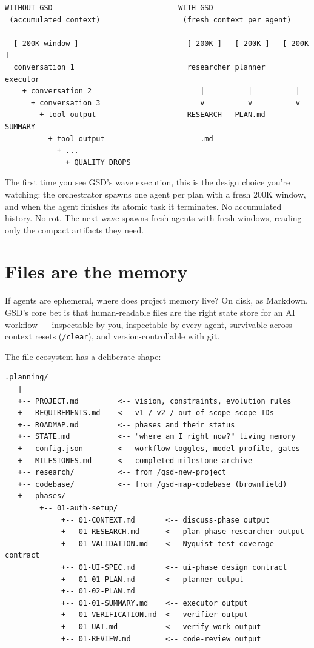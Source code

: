 \documentclass[11pt,letterpaper,openany]{book}
\begin{document}
\begin{lstlisting}[style=gsddiagram]
 WITHOUT GSD                             WITH GSD
 (accumulated context)                   (fresh context per agent)

  [ 200K window ]                         [ 200K ]   [ 200K ]   [ 200K ]
  conversation 1                          researcher planner   executor
    + conversation 2                         |          |          |
      + conversation 3                       v          v          v
        + tool output                     RESEARCH   PLAN.md    SUMMARY
          + tool output                      .md
            + ...
              + QUALITY DROPS
\end{lstlisting}

The first time you see GSD's wave execution, this is the design choice you're watching: the orchestrator spawns one agent per plan with a fresh 200K window, and when the agent finishes its atomic task it terminates. No accumulated history. No rot. The next wave spawns fresh agents with fresh windows, reading only the compact artifacts they need.

\section{Files are the memory}

If agents are ephemeral, where does project memory live? On disk, as Markdown. GSD's core bet is that human-readable files are the right state store for an AI workflow --- inspectable by you, inspectable by every agent, survivable across context resets (\texttt{/clear}), and version-controllable with git.

The file ecosystem has a deliberate shape:

\begin{lstlisting}[style=gsddiagram]
  .planning/
   |
   +-- PROJECT.md         <-- vision, constraints, evolution rules
   +-- REQUIREMENTS.md    <-- v1 / v2 / out-of-scope scope IDs
   +-- ROADMAP.md         <-- phases and their status
   +-- STATE.md           <-- "where am I right now?" living memory
   +-- config.json        <-- workflow toggles, model profile, gates
   +-- MILESTONES.md      <-- completed milestone archive
   +-- research/          <-- from /gsd-new-project
   +-- codebase/          <-- from /gsd-map-codebase (brownfield)
   +-- phases/
        +-- 01-auth-setup/
             +-- 01-CONTEXT.md       <-- discuss-phase output
             +-- 01-RESEARCH.md      <-- plan-phase researcher output
             +-- 01-VALIDATION.md    <-- Nyquist test-coverage contract
             +-- 01-UI-SPEC.md       <-- ui-phase design contract
             +-- 01-01-PLAN.md       <-- planner output
             +-- 01-02-PLAN.md
             +-- 01-01-SUMMARY.md    <-- executor output
             +-- 01-VERIFICATION.md  <-- verifier output
             +-- 01-UAT.md           <-- verify-work output
             +-- 01-REVIEW.md        <-- code-review output
\end{lstlisting}
\end{document}
